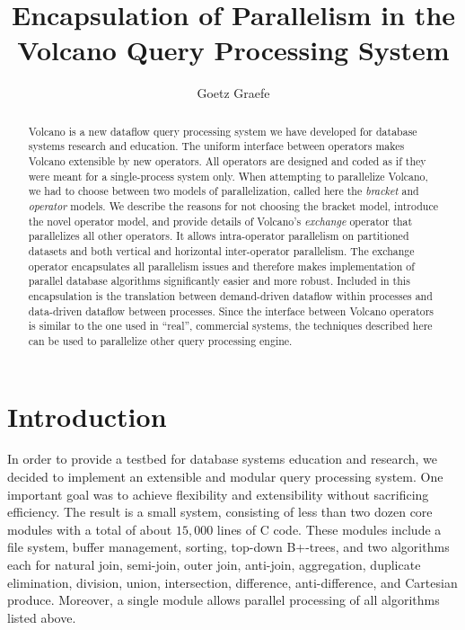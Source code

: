 \documentclass[a4paper,11pt,notitlepage,twoside,openright]{article}
\title{Encapsulation of Parallelism in the Volcano Query Processing System}
\author{Goetz Graefe}
\date{}
\begin{document}
\maketitle

\begin{abstract}
  Volcano is a new dataflow query processing system we have developed for database systems research and education.
  The uniform interface between operators makes Volcano extensible by new operators. All operators are designed and coded as
  if they were meant for a single-process system only. When attempting to parallelize Volcano, we had to choose between two
  models of parallelization, called here the \emph{bracket} and \emph{operator} models. We describe the reasons for not choosing the bracket
  model, introduce the novel operator model, and provide details of Volcano's \emph{exchange} operator that parallelizes all other operators.
  It allows intra-operator parallelism on partitioned datasets and both vertical and horizontal inter-operator parallelism. The
  exchange operator encapsulates all parallelism issues and therefore makes implementation of parallel database algorithms significantly
  easier and more robust. Included in this encapsulation is the translation between demand-driven dataflow within
  processes and data-driven dataflow between processes. Since the interface between Volcano operators is similar to the one
  used in ``real'', commercial systems, the techniques described here can be used to parallelize other query processing engine.
\end{abstract}

\section{Introduction}

In order to provide a testbed for database systems
education and research, we decided to implement an extensible
and modular query processing system. One important
goal was to achieve flexibility and extensibility without
sacrificing efficiency. The result is a small system, consisting
of less than two dozen core modules with a total of about
\(15,000\) lines of C code. These modules include a file system,
buffer management, sorting, top-down B+-trees, and
two algorithms each for natural join, semi-join, outer join,
anti-join, aggregation, duplicate elimination, division, union,
intersection, difference, anti-difference, and Cartesian produce.
Moreover, a single module allows parallel processing
of all algorithms listed above.
\end{document}
